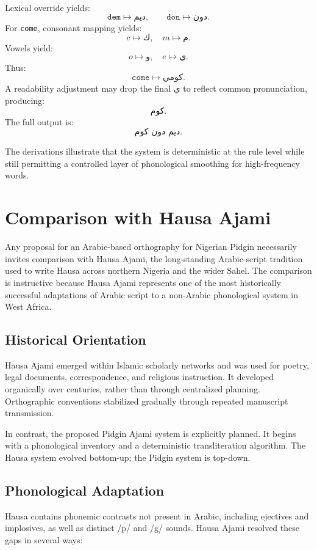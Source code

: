 \documentclass[12pt]{article}
\begin{document}
Lexical override yields:
\[
\texttt{dem} \mapsto \text{ديم},\qquad \texttt{don} \mapsto \text{دون}.
\]
For \texttt{come}, consonant mapping yields:
\[
c \mapsto ك,\quad m \mapsto م.
\]
Vowels yield:
\[
o \mapsto و,\quad e \mapsto ي.
\]
Thus:
\[
\texttt{come} \mapsto \text{كومي}.
\]
A readability adjustment may drop the final ي to reflect common pronunciation, producing:
\[
\text{كوم}.
\]
The full output is:
\[
\text{ديم دون كوم}.
\]

The derivations illustrate that the system is deterministic at the rule level while still permitting a controlled layer of phonological smoothing for high-frequency words.

\section{Comparison with Hausa Ajami}

Any proposal for an Arabic-based orthography for Nigerian Pidgin necessarily invites comparison with Hausa Ajami, the long-standing Arabic-script tradition used to write Hausa across northern Nigeria and the wider Sahel. The comparison is instructive because Hausa Ajami represents one of the most historically successful adaptations of Arabic script to a non-Arabic phonological system in West Africa.

\subsection{Historical Orientation}

Hausa Ajami emerged within Islamic scholarly networks and was used for poetry, legal documents, correspondence, and religious instruction. It developed organically over centuries, rather than through centralized planning. Orthographic conventions stabilized gradually through repeated manuscript transmission.

In contrast, the proposed Pidgin Ajami system is explicitly planned. It begins with a phonological inventory and a deterministic transliteration algorithm. The Hausa system evolved bottom-up; the Pidgin system is top-down.

\subsection{Phonological Adaptation}

Hausa contains phonemic contrasts not present in Arabic, including ejectives and implosives, as well as distinct /p/ and /g/ sounds. Hausa Ajami resolved these gaps in several ways:
\end{document}

